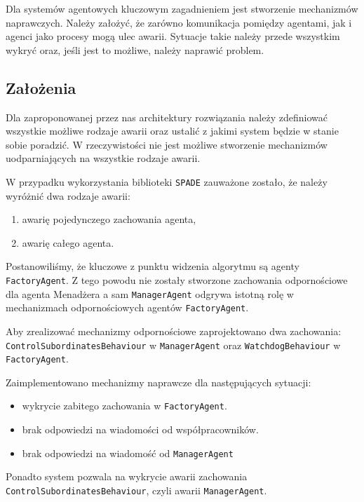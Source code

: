 
Dla systemów agentowych kluczowym zagadnieniem jest stworzenie mechanizmów naprawczych. Należy założyć, że zarówno komunikacja pomiędzy agentami, jak i agenci jako procesy mogą ulec awarii. Sytuacje takie należy przede wszystkim wykryć oraz, jeśli jest to możliwe, należy naprawić problem. 

\subsection{Założenia}

Dla zaproponowanej przez nas architektury rozwiązania należy zdefiniować wszystkie możliwe rodzaje awarii oraz ustalić z jakimi system będzie w stanie sobie poradzić. W rzeczywistości nie jest możliwe stworzenie mechanizmów uodparniających na wszystkie rodzaje awarii. 

W przypadku wykorzystania biblioteki \texttt{SPADE} zauważone zostało, że należy wyróżnić dwa rodzaje awarii:
\begin{enumerate}
	\item awarię pojedynczego zachowania agenta,
	\item awarię całego agenta.
\end{enumerate}

Postanowiliśmy, że kluczowe z punktu widzenia algorytmu są agenty \texttt{FactoryAgent}. Z tego powodu nie zostały stworzone zachowania odpornościowe dla agenta Menadżera a sam \texttt{ManagerAgent} odgrywa istotną rolę w mechanizmach odpornościowych agentów \texttt{FactoryAgent}. 

Aby zrealizować mechanizmy odpornościowe zaprojektowano dwa zachowania: \texttt{ControlSubordinatesBehaviour} w \texttt{ManagerAgent} oraz \texttt{WatchdogBehaviour} w \texttt{FactoryAgent}.
 
Zaimplementowano mechanizmy naprawcze dla następujących sytuacji:
\begin{itemize}
	\item wykrycie zabitego zachowania w \texttt{FactoryAgent}.
	\item brak odpowiedzi na wiadomości od współpracowników.
	\item brak odpowiedzi na wiadomość od \texttt{ManagerAgent}
\end{itemize}

Ponadto system pozwala na wykrycie awarii zachowania \texttt{ControlSubordinatesBehaviour}, czyli awarii \texttt{ManagerAgent}.

